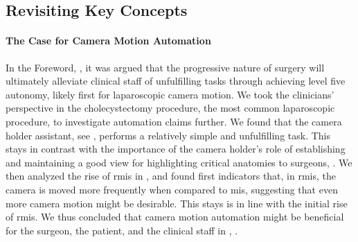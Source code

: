 \subsection{Revisiting Key Concepts}
\label{in:sec:revisiting_key_concepts}
\paragraph{The Case for Camera Motion Automation} In the Foreword, , it was argued that the progressive nature of surgery will ultimately alleviate clinical staff of unfulfilling tasks through achieving level five autonomy, likely first for laparoscopic camera motion. We took the clinicians' perspective in the cholecystectomy procedure, the most common laparoscopic procedure, to investigate automation claims further. We found that the camera holder assistant, see , performs a relatively simple and unfulfilling task. This stays in contrast with the importance of the camera holder's role of establishing and maintaining a good view for highlighting critical anatomies to surgeons, . We then analyzed the rise of \gls{rmis} in , and found first indicators that, in \gls{rmis}, the camera is moved more frequently when compared to \gls{mis}, suggesting that even more camera motion might be desirable. This stays is in line with the initial rise of \gls{rmis}. We thus concluded that camera motion automation might be beneficial for the surgeon, the patient, and the clinical staff in , .

